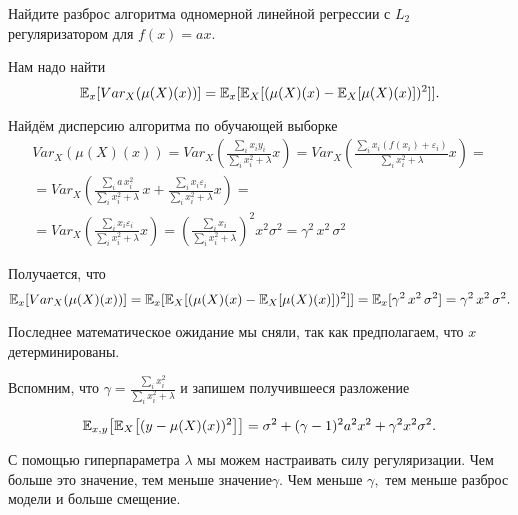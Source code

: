 \documentclass[12pt,fleqn]{article}
\begin{document}
\begin{vkProblem}
Найдите разброс алгоритма одномерной линейной регрессии с $L_2$ регуляризатором для $f(x) = ax$. 
\end{vkProblem}
\begin{esSolution}
    Нам надо найти \[ \mathbb{E}_{x}[Var_X(\mu(X)(x))] =  \mathbb{E}_{x} [\mathbb{E}_{X} [(\mu(X)(x) - \mathbb{E}_{X}[\mu(X)(x)] )^2 ]].\]

    Найдём дисперсию алгоритма по обучающей выборке 
    \begin{multline*}
        Var_X(\mu(X)(x)) =  Var_X \left( \frac{\sum_i x_i y_i}{\sum_i x_i^2 + \lambda} x \right) = Var_X \left( \frac{\sum_i x_i (f(x_i) + \varepsilon_i)}{\sum_i x_i^2 + \lambda} x \right) = \\ = Var_X \left( \frac{\sum_i a \, x_i^2}{\sum_i x_i^2 + \lambda} \, x  + \frac{\sum_i x_i \varepsilon_i}{\sum_i x_i^2 + \lambda} x \right) = \\ = Var_X  \left(\frac{\sum_i x_i \varepsilon_i}{\sum_i x_i^2 + \lambda} x \right) = \left(\frac{\sum_i x_i}{\sum_i x_i^2 + \lambda}\right)^2 x^2 \sigma^2 = \gamma^2 \, x^2 \, \sigma^2
    \end{multline*}

    Получается, что 
    \[
    \mathbb{E}_{x}[Var_X(\mu(X)(x))] = \mathbb{E}_{x} [\mathbb{E}_{X} [(\mu(X)(x) - \mathbb{E}_{X}[\mu(X)(x)] )^2 ]] = \mathbb{E}_{x}[\gamma^2 \, x^2 \, \sigma^2] = \gamma^2 \, x^2 \, \sigma^2.
    \]

    Последнее математическое ожидание мы сняли, так как предполагаем, что $x$ детерминированы. 
\end{esSolution}

Вспомним, что $\gamma = \frac{\sum_i x_i^2}{\sum_i x_i^2 + \lambda}$ и запишем получившееся разложение

$$
\mathbb{E}_{x, y}\bigl[\mathbb{E}_{X}\bigl[ (y - \mu(X)(x))^2 \bigr]\bigr] = \sigma^2 + (\gamma - 1)^2 a^2 x^2 + \gamma^2 x^2 \sigma^2.
$$

С помощью гиперпараметра $\lambda$ мы можем настраивать силу регуляризации. Чем больше это значение, тем меньше значение$\gamma$. Чем меньше $\gamma,$ тем меньше разброс модели и больше смещение. 
\end{document}
